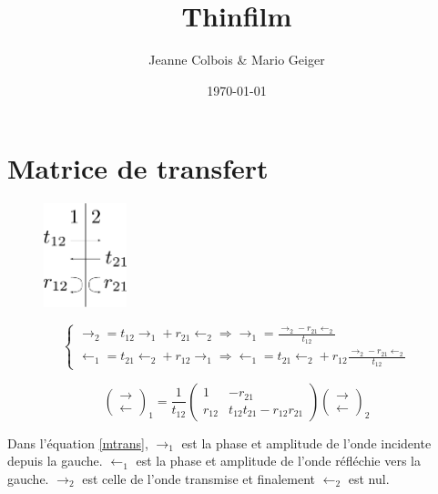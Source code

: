 \documentclass[a4paper,english]{article}
\begin{document}
\title{Thinfilm}
\author{Jeanne Colbois \& Mario Geiger}
\date{\today}
\maketitle

\section{Matrice de transfert}

\begin{figure}[H]
	\centering
	\includegraphics[height=3cm]{interface.pdf}
\end{figure}

\begin{equation}
\left\{ \begin{array}{ll}
\rightarrow_2 = t_{12} \rightarrow_1 + r_{21} \leftarrow_2  \Rightarrow \rightarrow_1 = \frac{\rightarrow_2 - r_{21} \leftarrow_2}{t_{12}} \\
\leftarrow_1 = t_{21} \leftarrow_2 + r_{12} \rightarrow_1 \Rightarrow \leftarrow_1 = t_{21} \leftarrow_2 + r_{12} \frac{\rightarrow_2 - r_{21} \leftarrow_2}{t_{12}}
\end{array}\right. 
\end{equation}

\begin{equation}\label{mtrans}
\begin{pmatrix}\rightarrow \\ \leftarrow \end{pmatrix}_1 = 
\frac{1}{t_{12}}\begin{pmatrix} 1 & -r_{21} \\ r_{12} & t_{12}t_{21} - r_{12}r_{21} \end{pmatrix} 
\begin{pmatrix}\rightarrow \\ \leftarrow\end{pmatrix}_2
\end{equation}

Dans l'équation \eqref{mtrans}, $\rightarrow_1$ est la phase et amplitude de l'onde incidente depuis la gauche. $\leftarrow_1$ est la phase et amplitude de l'onde réfléchie vers la gauche. $\rightarrow_2$ est celle de l'onde transmise et finalement $\leftarrow_2$ est nul.
\end{document}
